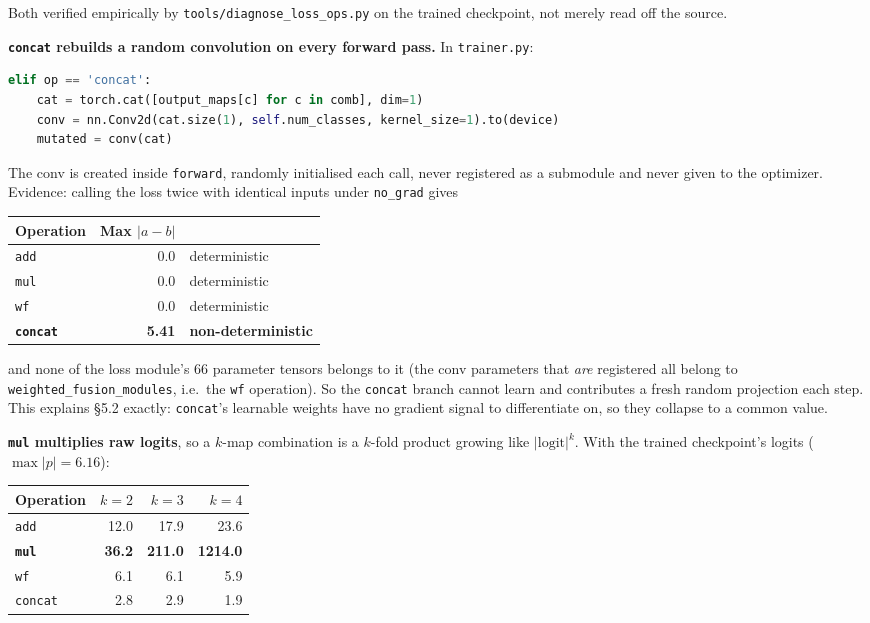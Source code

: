 \documentclass[11pt,a4paper]{article}
\newcommand{\code}[1]{\texttt{\small #1}}
\begin{document}
Both verified empirically by \code{tools/diagnose\_loss\_ops.py} on the trained
checkpoint, not merely read off the source.

\textbf{\code{concat} rebuilds a random convolution on every forward pass.} In
\code{trainer.py}:

\begin{lstlisting}[language=Python]
elif op == 'concat':
    cat = torch.cat([output_maps[c] for c in comb], dim=1)
    conv = nn.Conv2d(cat.size(1), self.num_classes, kernel_size=1).to(device)
    mutated = conv(cat)
\end{lstlisting}

The conv is created inside \code{forward}, randomly initialised each call, never
registered as a submodule and never given to the optimizer. Evidence: calling
the loss twice with identical inputs under \code{no\_grad} gives

\begin{center}
\begin{tabular}{@{}lr l@{}}
\toprule
\textbf{Operation} & \textbf{Max $|a-b|$} & \\
\midrule
\code{add} & 0.0 & deterministic \\
\code{mul} & 0.0 & deterministic \\
\code{wf} & 0.0 & deterministic \\
\textbf{\code{concat}} & \textbf{5.41} & \textbf{non-deterministic} \\
\bottomrule
\end{tabular}
\end{center}

and none of the loss module's 66 parameter tensors belongs to it (the conv
parameters that \emph{are} registered all belong to
\code{weighted\_fusion\_modules}, i.e.\ the \code{wf} operation). So the
\code{concat} branch cannot learn and contributes a fresh random projection each
step. This explains \S5.2 exactly: \code{concat}'s learnable weights have no
gradient signal to differentiate on, so they collapse to a common value.

\textbf{\code{mul} multiplies raw logits}, so a $k$-map combination is a
$k$-fold product growing like $|\text{logit}|^k$. With the trained checkpoint's
logits ($\max |p| = 6.16$):

\begin{center}
\begin{tabular}{@{}lrrr@{}}
\toprule
\textbf{Operation} & $k=2$ & $k=3$ & $k=4$ \\
\midrule
\code{add} & 12.0 & 17.9 & 23.6 \\
\textbf{\code{mul}} & \textbf{36.2} & \textbf{211.0} & \textbf{1214.0} \\
\code{wf} & 6.1 & 6.1 & 5.9 \\
\code{concat} & 2.8 & 2.9 & 1.9 \\
\bottomrule
\end{tabular}
\end{center}
\end{document}
